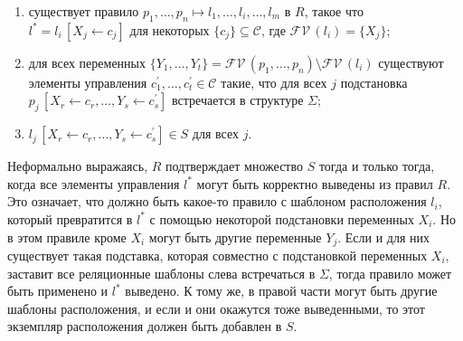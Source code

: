 
\begin{enumerate}
\item существует правило $p_1,\dots,p_n\mapsto l_1,\dots,l_i,\dots, l_m$ в $R$, такое что
  $l^*=l_i\,[X_j\gets c_j]$  для некоторых
  $\{c_j\}\subseteq\mathcal{C}$, где $\mathcal{FV}\,(l_i)=\{X_j\}$;

\item для всех переменных $\{Y_1,\dots,Y_t\}=\mathcal{FV}\,(p_1,\dots,p_n)\setminus\mathcal{FV}\,(l_i)$ существуют элементы управления
$c^\prime_1,\dots,c^\prime_t\in\mathcal{C}$ такие, что для всех $j$ подстановка \mbox{$p_j\,[X_r\gets c_r,\dots,Y_s\gets c^\prime_s]$}
   встречается в структуре $\Sigma$;

\item \mbox{$l_j\,[X_r\gets c_r,\dots,Y_s\gets c^\prime_s]\in S$} для всех $j$.

\end{enumerate}

Неформально выражаясь, $R$ подтверждает множество $S$ тогда и только тогда, когда  все элементы управления $l^*$
могут быть корректно выведены из правил $R$. Это означает, что должно быть какое-то правило с шаблоном расположения $l_i$, который превратится в $l^*$ с помощью некоторой подстановки  переменных $X_i$. Но в этом правиле кроме $X_i$ могут быть другие переменные $Y_j$.
Если и для них существует такая подставка, которая совместно с подстановкой переменных $X_i$, заставит все реляционные шаблоны слева встречаться в  $\Sigma$,
тогда правило может быть применено и $l^*$ выведено. К тому же, в  правой части могут быть другие шаблоны расположения, и если и они окажутся тоже выведенными,
то этот экземпляр расположения должен быть добавлен в $S$.



